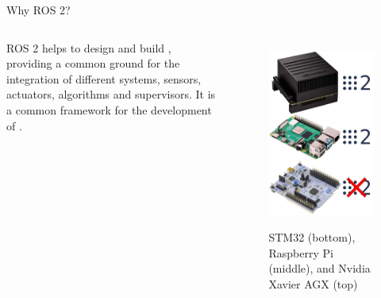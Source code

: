 \begin{frame}{Why ROS 2?}
	\begin{columns}
		ROS 2 helps to design and build , providing a common ground for the integration of different systems, sensors, actuators, algorithms and supervisors. It is a common framework for the development of .

		\begin{figure}
			\centering
      \includegraphics[scale=.19]{why_ros2.png}
      \label{fig:whyros2}
      \caption{STM32 (bottom), Raspberry Pi (middle), and Nvidia Xavier AGX (top)}
		\end{figure}
	\end{columns}
\end{frame}

